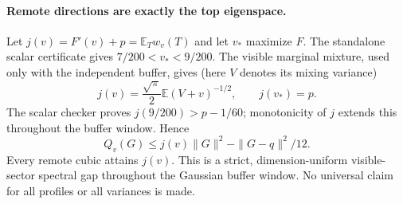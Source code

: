 \paragraph{Remote directions are exactly the top eigenspace.}
Let $j(v)=F'(v)+p=\mathbb E_Tw_v(T)$ and let $v_*$ maximize $F$.
The standalone scalar certificate gives
$7/200<v_*<9/200$. The visible marginal mixture, used only
with the independent buffer, gives (here $V$ denotes its mixing variance)
\[
 j(v)=\frac{\sqrt\pi}{2}\mathbb E(V+v)^{-1/2},\qquad j(v_*)=p.
\]
The scalar checker proves $j(9/200)>p-1/60$; monotonicity of $j$
extends this throughout the buffer window. Hence
\begin{equation}\label{eq:full-buffer-spectral-gap}
 \boxed{Q_v(G)\le j(v)\|G\|^2-\|G-q\|^2/12.}
\end{equation}
Every remote cubic attains $j(v)$. This is a strict, dimension-uniform
visible-sector spectral gap throughout the Gaussian buffer window.
No universal claim for all profiles or all variances is made.

